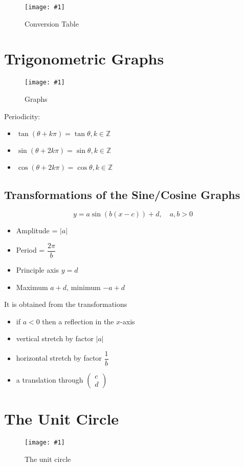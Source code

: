 \documentclass[11pt]{article}
\newcommand{\img}[3]{\begin{center}
  \begin{figure}[H]
    \centering
    \texttt{[image: \#1]}
    \caption{#3}
    \label{fig:fig1}
  \end{figure}
\end{center}}
\begin{document}
\img{imagetrigfunctions9.jpg}{0.9}{Conversion Table}

\section{Trigonometric Graphs}

\img{graphs.png}{1}{Graphs}

\noindent Periodicity:
\begin{itemize}
  \item $\tan(\theta + k\pi) = \tan \theta, k\in \mathbb{Z}$
  \item $\sin(\theta + 2k\pi) = \sin \theta, k\in \mathbb{Z}$
  \item $\cos(\theta + 2k\pi) = \cos \theta, k\in \mathbb{Z}$
\end{itemize}

\pagebreak

\subsection{Transformations of the Sine/Cosine Graphs}

$$y = a\sin(b(x - c)) + d,\,\,\,\,\,\, a, b > 0$$
\begin{itemize}
  \item Amplitude = $|a|$
  \item Period = $\dfrac{2\pi}{b}$
  \item Principle axis $y = d$
  \item Maximum $a + d$, minimum $-a + d$
\end{itemize}
It is obtained from the transformations
\begin{itemize}
  \item if $a < 0$ then a reflection in the $x$-axis
  \item vertical stretch by factor $|a|$
  \item horizontal stretch by factor $\dfrac{1}{b}$
  \item a translation through $\begin{pmatrix}c\\d\end{pmatrix}$
\end{itemize}

\section{The Unit Circle}

\img{unitcirc.png}{1}{The unit circle}
\end{document}
